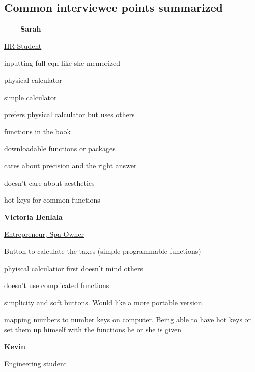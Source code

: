 \documentclass[a4paper]{article}
\begin{document}
\subsection{Common interviewee points summarized}

\textbf{\ \ \ \  Sarah}

\underline{HR Student}

\begin{compactitem}
\item inputting full eqn like she memorized
\item physical calculator 
\item simple calculator
\item prefers physical calculator but uses others
\item functions in the book
\item downloadable functions or packages
\item cares about precision and the right answer
\item doesn’t care about aesthetics
\item hot keys for common functions
\end{compactitem}
\bigskip

\textbf{Victoria  Benlala}

\underline{Entrepreneur, Spa Owner}

\begin{compactitem}
\item Button to calculate the taxes (simple programmable functions)
\item phyiscal calculatior first doesn’t mind others
\item doesn’t use complicated functions
\item simplicity and soft buttons. Would like a more portable version.
\item mapping numbers to number keys on computer. Being able to have hot keys or set them up himself with the functions he or she is given
\end{compactitem}
\bigskip

\textbf{Kevin}

\underline{Engineering student}
\end{document}

